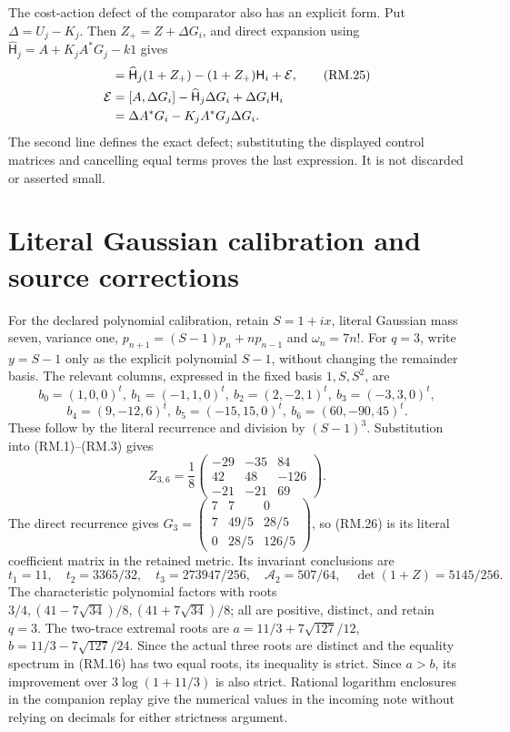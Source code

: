 \documentclass[11pt]{article}
\begin{document}
The cost-action defect of the comparator also has an explicit form.
Put $\Delta=U_j-K_j$. Then
$Z_+=Z+\Delta G_i$, and direct expansion using
$\widehat{\mathsf H}_j=A+K_jA^*G_j-k1$ gives
\begin{align}
 [A,Z_+]&=\widehat{\mathsf H}_j(1+Z_+)
 -(1+Z_+)\mathsf H_i+\mathcal E,\tag{RM.25}\\
 \mathcal E&=[A,\Delta G_i]-\widehat{\mathsf H}_j\Delta G_i
 +\Delta G_i\mathsf H_i\notag\\
 &=\Delta A^*G_i-K_jA^*G_j\Delta G_i.\notag
\end{align}
The second line defines the exact defect; substituting the displayed
control matrices and cancelling equal terms proves the last expression.
It is not discarded or asserted small.

\section{Literal Gaussian calibration and source corrections}
For the declared polynomial calibration, retain $S=1+ix$, literal Gaussian
mass seven, variance one, $p_{n+1}=(S-1)p_n+np_{n-1}$ and $\omega_n=7n!$.
For $q=3$, write $y=S-1$ only as the explicit polynomial $S-1$, without
changing the remainder basis. The relevant columns, expressed in the fixed
basis $1,S,S^2$, are
\[
 b_0=(1,0,0)^t,\ b_1=(-1,1,0)^t,\ b_2=(2,-2,1)^t,
 \ b_3=(-3,3,0)^t,
\]
\[
 b_4=(9,-12,6)^t,\ b_5=(-15,15,0)^t,
 \ b_6=(60,-90,45)^t.
\]
These follow by the literal recurrence and division by $(S-1)^3$.
Substitution into (RM.1)--(RM.3) gives
\begin{equation}
 Z_{3,6}=\frac1{8}
 \begin{pmatrix}-29&-35&84\\42&48&-126\\-21&-21&69\end{pmatrix}.
 \tag{RM.26}
\end{equation}
The direct recurrence gives
$G_3=\left(\begin{smallmatrix}7&7&0\\7&49/5&28/5\\0&28/5&126/5\end{smallmatrix}\right)$,
so (RM.26) is its literal coefficient matrix in the retained metric.
Its invariant conclusions are
\begin{equation}
 t_1=11,\quad t_2=3365/32,\quad t_3=273947/256,\quad
 \mathcal A_2=507/64,\quad\det(1+Z)=5145/256.\tag{RM.27}
\end{equation}
The characteristic polynomial factors with roots
$3/4,(41-7\sqrt{34})/8,(41+7\sqrt{34})/8$; all are positive, distinct,
and retain $q=3$. The two-trace extremal roots are
$a=11/3+7\sqrt{127}/12$, $b=11/3-7\sqrt{127}/24$.
Since the actual three roots are distinct and the equality spectrum in
(RM.16) has two equal roots, its inequality is strict. Since $a>b$, its
improvement over $3\log(1+11/3)$ is also strict. Rational logarithm
enclosures in the companion replay give the numerical values in the incoming
note without relying on decimals for either strictness argument.
\end{document}
